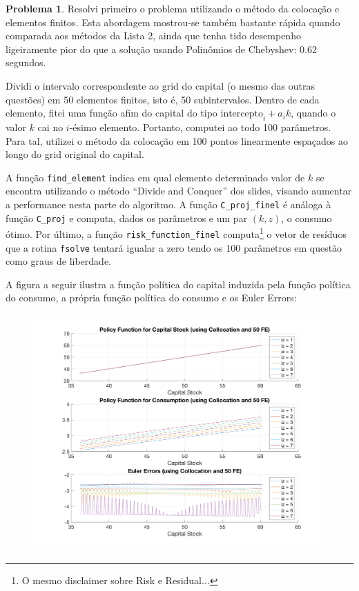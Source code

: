 \documentclass[11pt]{article}
\theoremstyle{definition}
\newtheorem{prob}{Problema}
\theoremstyle{solution}
\begin{document}
\FloatBarrier
\begin{prob}
	Resolvi primeiro o problema utilizando o método da colocação e elementos finitos. Esta abordagem mostrou-se também bastante rápida quando comparada aos métodos da Lista 2, ainda que tenha tido desempenho ligeiramente pior do que a solução usando Polinômios de Chebyshev: 0.62 segundos.
	
	Dividi o intervalo correspondente ao grid do capital (o mesmo das outras questões) em 50 elementos finitos, isto é, 50 subintervalos. Dentro de cada elemento, fitei uma função afim do capital do tipo $\text{intercepto}_{i} + a_{i}k$, quando o valor $k$ cai no $i$-ésimo elemento. Portanto, computei ao todo 100 parâmetros. Para tal, utilizei o método da colocação em 100 pontos linearmente espaçados ao longo do grid original do capital.
	
	A função \texttt{find\_element} indica em qual elemento determinado valor de $k$ se encontra utilizando o método ``Divide and Conquer'' dos slides, visando aumentar a performance nesta parte do algoritmo. A função \texttt{C\_proj\_finel} é análoga à função \texttt{C\_proj} e computa, dados os parâmetros e  um par $(k,z)$, o consumo ótimo. Por último, a função \texttt{risk\_function\_finel} computa\footnote{O mesmo disclaimer sobre Risk e Residual...} o vetor de resíduos que a rotina \texttt{fsolve} tentará igualar a zero tendo os 100 parâmetros em questão como graus de liberdade.
	
	A figura a seguir ilustra a função política do capital induzida pela função política do consumo, a própria função política do consumo e os Euler Errors:
	\begin{figure}[h!]
		\centering
		\includegraphics[scale = 0.25]{finel}
	\end{figure}
	

\end{prob}
\end{document}
